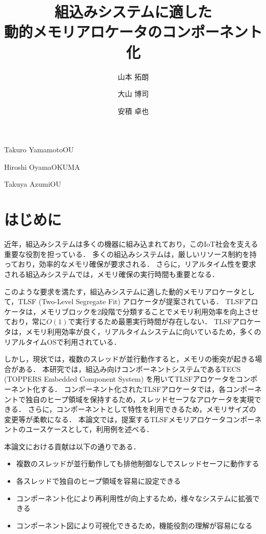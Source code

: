 \documentclass[submit,techrep]{ipsj_v2/UTF8/ipsj}
\begin{document}
\title{組込みシステムに適した\\動的メモリアロケータのコンポーネント化}




\author{山本 拓朗}{Takuro Yamamoto}{OU}%
\author{大山 博司}{Hiroshi Oyama}{OKUMA}%
\author{安積 卓也}{Takuya Azumi}{OU}%

\maketitle

\section{はじめに}
近年，組込みシステムは多くの機器に組み込まれており，このIoT社会を支える重要な役割を担っている\cite{par:IoTIndustries}\cite{par:IoTComputing}．
多くの組込みシステムは，厳しいリソース制約を持っており，効率的なメモリ確保が要求される．
さらに，リアルタイム性を要求される組込みシステムでは，メモリ確保の実行時間も重要となる．

このような要求を満たす，組込みシステムに適した動的メモリアロケータとして，TLSF (Two-Level Segregate Fit) アロケータが提案されている\cite{par:TLSF}\cite{url:TLSF}．
TLSFアロケータは，メモリブロックを2段階で分類することでメモリ利用効率を向上させており，常に$O(1)$で実行するため最悪実行時間が存在しない．
TLSFアロケータは，メモリ利用効率が良く，リアルタイムシステムに向いているため，多くのリアルタイムOSで利用されている．

しかし，現状では，複数のスレッドが並行動作すると，メモリの衝突が起きる場合がある．
本研究では，組込み向けコンポーネントシステムであるTECS (TOPPERS Embedded Component System)\cite{par:TECS} を用いてTLSFアロケータをコンポーネント化する．
コンポーネント化されたTLSFアロケータでは，各コンポーネントで独自のヒープ領域を保持するため，スレッドセーフなアロケータを実現できる．
さらに，コンポーネントとして特性を利用できるため，メモリサイズの変更等が柔軟になる．
本論文では，提案するTLSFメモリアロケータコンポーネントのユースケースとして，利用例を述べる．

本論文における貢献は以下の通りである．
\begin{itemize}
    \item 複数のスレッドが並行動作しても排他制御なしでスレッドセーフに動作する
    \item 各スレッドで独自のヒープ領域を容易に設定できる
    \item コンポーネント化により再利用性が向上するため，様々なシステムに拡張できる
    \item コンポーネント図により可視化できるため，機能役割の理解が容易になる
\end{itemize}
\end{document}
